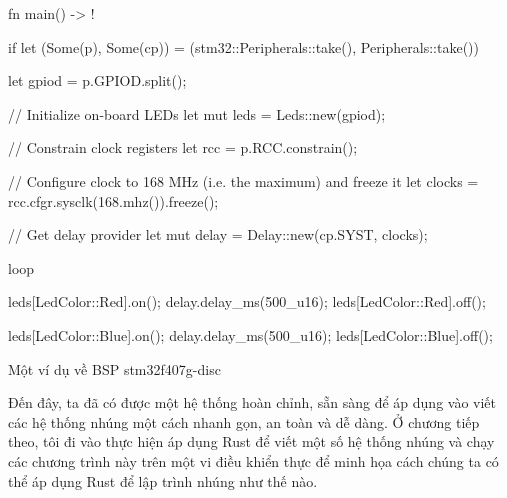 \clearpage
\begin{listing}[ht]
\begin{rustcode}
fn main() -> ! {
    if let (Some(p), Some(cp)) = (stm32::Peripherals::take(), Peripherals::take()) {
        let gpiod = p.GPIOD.split();

        // Initialize on-board LEDs
        let mut leds = Leds::new(gpiod);

        // Constrain clock registers
        let rcc = p.RCC.constrain();

        // Configure clock to 168 MHz (i.e. the maximum) and freeze it
        let clocks = rcc.cfgr.sysclk(168.mhz()).freeze();

        // Get delay provider
        let mut delay = Delay::new(cp.SYST, clocks);

        loop {
            leds[LedColor::Red].on();
            delay.delay_ms(500_u16);
            leds[LedColor::Red].off();

            leds[LedColor::Blue].on();
            delay.delay_ms(500_u16);
            leds[LedColor::Blue].off();
        }
    }
}
\end{rustcode}
\caption{Một ví dụ về BSP stm32f407g-disc}
\label{code:rust_stm32f407g}
\end{listing}

\bigskip
Đến đây, ta đã có được một hệ thống hoàn chỉnh, sẵn sàng để áp dụng vào viết các hệ thống nhúng một cách nhanh gọn, an toàn và dễ dàng.
Ở chương tiếp theo, tôi đi vào thực hiện áp dụng Rust để viết một số hệ thống nhúng và chạy các chương trình này trên một vi điều khiển thực để minh họa cách chúng ta có thể áp dụng Rust để lập trình nhúng như thế nào.
